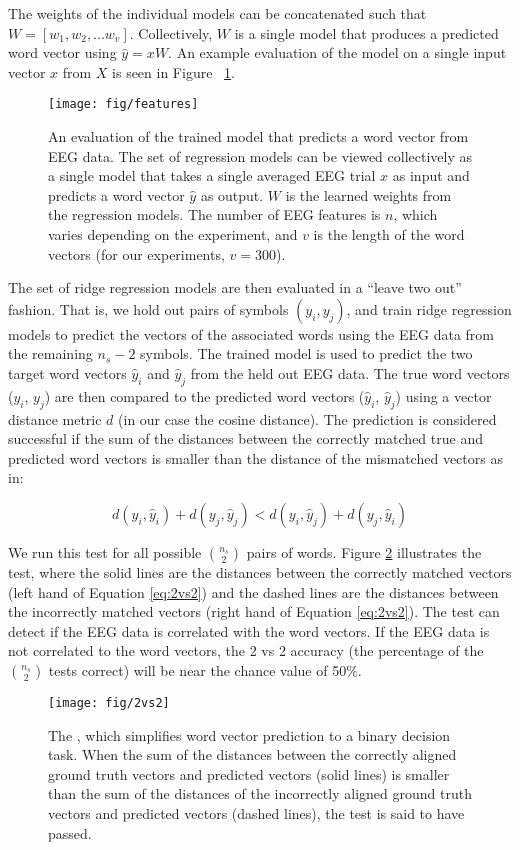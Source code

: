   The weights of the individual models can be concatenated such that $W = [ w_1, w_2, ... w_v ]$. Collectively, $W$ is a single model that produces a predicted word vector using $\hat{y} = xW$. An example evaluation of the model on a single input vector $x$ from $X$ is seen in Figure ~\ref{fig:features}.

  \begin{figure}[t]
    \centering
    \texttt{[image: fig/features]}
    \caption{An evaluation of the trained model that predicts a word vector from EEG data. The set of regression models can be viewed collectively as a single model that takes a single averaged EEG trial $x$ as input and predicts a word vector $\hat{y}$ as output. $W$ is the learned weights from the regression models. The number of EEG features is $n$, which varies depending on the experiment, and $v$ is the length of the word vectors (for our experiments, $v=300$).}
    \label{fig:features}
  \end{figure}

  The set of ridge regression models are then evaluated in a ``leave two out'' fashion. That is, we hold out pairs of symbols $(y_i, y_j)$, and train ridge regression models to predict the vectors of the associated words using the EEG data from the remaining $n_s-2$ symbols.  The trained model is used to predict the two target word vectors $\hat{y}_i$ and $\hat{y}_j$ from the held out EEG data. The true word vectors ($y_i$, $y_j$) are then compared to the predicted word vectors ($\hat{y}_i$, $\hat{y}_j$) using a vector distance metric $d$ (in our case the cosine distance). The prediction is considered successful if the sum of the distances between the correctly matched true and predicted word vectors is smaller than the distance of the mismatched vectors as in: 
  
  \begin{equation}
    d(y_i, \hat{y}_i) + d(y_j, \hat{y}_j) < d(y_i, \hat{y}_j) + d(y_j, \hat{y}_i)
    \label{eq:2vs2}
  \end{equation}
  
  \noindent We run this test for all possible ${\binom{n_s}{2}}$ pairs of words. Figure \ref{fig:2vs2} illustrates the \tvt test, where the solid lines are the distances between the correctly matched vectors (left hand of Equation \ref{eq:2vs2}) and the dashed lines are the distances between the incorrectly matched vectors (right hand of Equation \ref{eq:2vs2}). The \tvt test can detect if the EEG data is correlated with the word vectors. If the EEG data is not correlated to the word vectors, the 2 vs 2 accuracy (the percentage of the ${\binom{n_s}{2}}$ \tvt tests correct) will be  near the chance value of 50\%.

  \begin{figure}[t]
    \centering
    \texttt{[image: fig/2vs2]}
    \caption{The \tvt, which simplifies word vector prediction to a binary decision task.  
   When the sum of the distances between the correctly aligned ground truth vectors and predicted vectors (solid lines) is smaller than the sum of the distances of the incorrectly aligned ground truth vectors and predicted vectors (dashed lines), the \tvt test is said to have passed.}
    \label{fig:2vs2}
  \end{figure}

